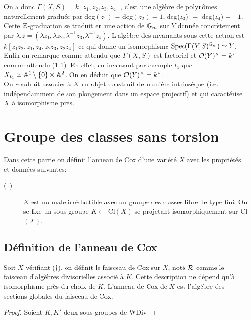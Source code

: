 On a donc $\Gamma(X, S)=k[z_1,z_2,z_3,z_4]$, c'est une algèbre de polynômes naturellement graduée par deg$(z_1)$ = deg$(z_2)=1$, deg($z_3$) $=$ deg($z_4$)$=-1$. Cette $\mathbb{Z}$-graduation se traduit en une action de $\mathbb{G}_m$ sur $Y$ donnée  concrètement par $\lambda.z=(\lambda z_1,\lambda z_2,\lambda^{-1} z_3,\lambda^{-1} z_4)$. L'algèbre des invariants sous cette action est $k[z_1z_2,z_1,z_4,z_2z_3,z_2z_4]$ ce qui donne un isomorphisme $\operatorname{Spec}(\Gamma(Y,S)^{\mathbb{G}_m})\simeq Y$. 
Enfin on remarque comme attendu que $\Gamma(X, S)$ est factoriel et $\mathcal{O}(Y)^{\times}=k^*$ comme attendu (\ref{}). En effet, en inversant par exemple $t_1$  que $X_{t_1}\simeq \mathbb{A}^{1}\setminus \lbrace0\rbrace\times\mathbb{A}^{2}$. On en déduit que $\mathcal{O}(Y)^{\times}=k^*$.\\

On voudrait associer à $X$ un objet construit de manière intrinsèque (i.e. indépendamment de son plongement dans un espace projectif) et qui caractérise $X$ à isomorphisme près.
 

\section{Groupe des classes sans torsion}

Dans cette partie on définit l'anneau de Cox d'une variété $X$ avec les propriétés et données suivantes:
\begin{description}
\item [($\dagger$)] $X$ est normale irréductible avec un groupe des classes libre de type fini. On se fixe un sous-groupe $K\subset $ Cl$(X)$ se projetant isomorphiquement sur Cl$(X)$.
\end{description}

\subsection{Définition de l'anneau de Cox}

\begin{cons}
Soit $X$ vérifiant ($\dagger$), on définit le faisceau de Cox sur $X$, noté $\mathcal{R}$ comme le faisceau d'algèbres divisorielles associé à $K$. Cette description ne dépend qu'à isomorphisme près du choix de $K$. L'anneau de Cox de $X$ est l'algèbre des sections globales du faisceau de Cox. 
\end{cons}
\begin{proof}
Soient $K,K'$ deux sous-groupes de WDiv
\end{proof}



